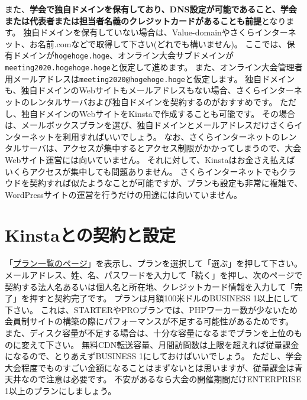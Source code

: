 \documentclass[titlepage,10pt,a4paper,uplatex]{jsbook}
\renewcommand{\textbf}[1]{{\bfseries\sffamily#1}}
\begin{document}
また、\textbf{学会で独自ドメインを保有しており、DNS設定が可能であること、学会または代表者または担当者名義のクレジットカードがあることも前提}となります。
独自ドメインを保有していない場合は、Value-domainやさくらインターネット、お名前.comなどで取得して下さい(どれでも構いません)。
ここでは、保有ドメインが\texttt{hogehoge.hoge}、オンライン大会サブドメインが\texttt{meeting2020.hogehoge.hoge}と仮定して進めます。
また、オンライン大会管理者用メールアドレスは\texttt{meeting2020@hogehoge.hoge}と仮定します。
独自ドメインも、独自ドメインのWebサイトもメールアドレスもない場合、さくらインターネットのレンタルサーバおよび独自ドメインを契約するのがおすすめです。
ただし、独自ドメインのWebサイトをKinstaで作成することも可能です。
その場合は、メールボックスプランを選び、独自ドメインとメールアドレスだけさくらインターネットを利用すればいいでしょう。
なお、さくらインターネットのレンタルサーバは、アクセスが集中するとアクセス制限がかかってしまうので、大会Webサイト運営には向いていません。
それに対して、Kinstaはお金さえ払えばいくらアクセスが集中しても問題ありません。
さくらインターネットでもクラウドを契約すれば似たようなことが可能ですが、プランも設定も非常に複雑で、WordPressサイトの運営を行うだけの用途には向いていません。

\section{Kinstaとの契約と設定}

「\href{https://kinsta.com/jp/plans/}{プラン一覧のページ}」を表示し、プランを選択して「選ぶ」を押して下さい。
メールアドレス、姓、名、パスワードを入力して「続く」を押し、次のページで契約する法人名あるいは個人名と所在地、クレジットカード情報を入力して「完了」を押すと契約完了です。
プランは月額100米ドルのBUSINESS 1以上にして下さい。
これは、STARTERやPROプランでは、PHPワーカー数が少ないため会員制サイトの構築の際にパフォーマンスが不足する可能性があるためです。
また、ディスク容量が不足する場合は、十分な容量になるまでプランを上位のものに変えて下さい。
無料CDN転送容量、月間訪問数は上限を超えれば従量課金になるので、とりあえずBUSINESS 1にしておけばいいでしょう。
ただし、学会大会程度でものすごい金額になることはまずないとは思いますが、従量課金は青天井なので注意は必要です。
不安があるなら大会の開催期間だけENTERPRISE 1以上のプランにしましょう。
\end{document}
